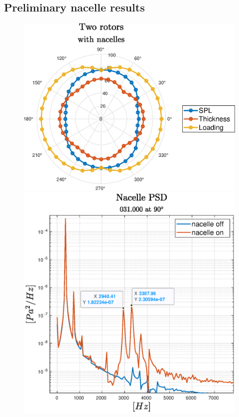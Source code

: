 \subsection{Preliminary nacelle results}

\begin{frame} {\subsecname}
    \begin{figure}
\centering
\begin{minipage}{.5\textwidth}
  \centering
  \includegraphics[scale=0.35]{Photos/spl_thick_load_nacelles.eps}
\end{minipage}%
\begin{minipage}{.5\textwidth}
  \centering
  \includegraphics[scale=0.35]{Photos/psd_nacelle.eps}
\end{minipage}
\end{figure}
\end{frame}